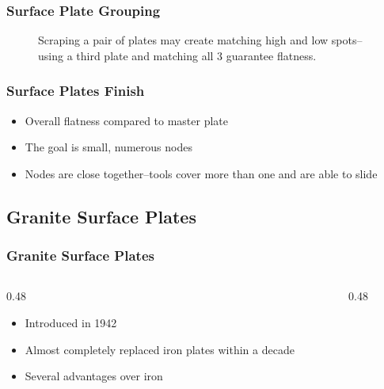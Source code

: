 \begin{frame}
    \frametitle{Surface Plate Grouping}

    \begin{figure}
        \centering
        \resizebox{0.625\linewidth}{!}{
            
        }

        \vspace{0.5em}
        {\footnotesize Scraping a pair of plates may create matching high and low spots--using a third plate and matching all 3 guarantee flatness.\par}
    \end{figure}
\end{frame}

\begin{frame}
	\frametitle{Surface Plates Finish}

    \begin{itemize}[<+- | alert@+>]
        \item Overall flatness compared to master plate
        \item The goal is small, numerous nodes
        \item Nodes are close together--tools cover more than one and are able to slide
    \end{itemize}
\end{frame}

\subsection{Granite Surface Plates}

\begin{frame}
	\frametitle{Granite Surface Plates}

    \begin{columns}
        \begin{column}{0.48\linewidth}
            \begin{itemize}[<+- | alert@+>]
                \item Introduced in 1942
                \item Almost completely replaced iron plates within a decade
                \item Several advantages over iron
            \end{itemize}
        \end{column}
        \begin{column}{0.48\linewidth}
        \end{column}
    \end{columns}
\end{frame}

